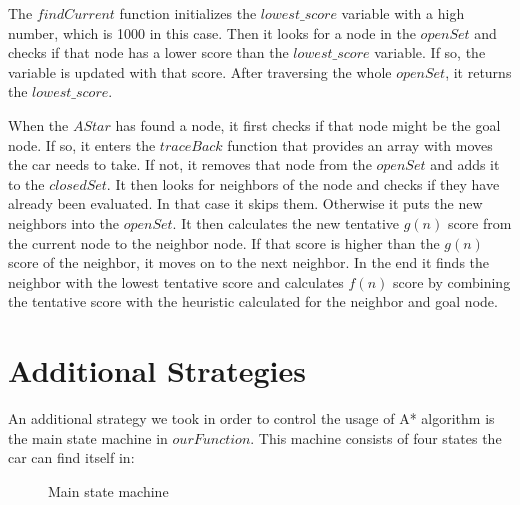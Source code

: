 \documentclass[a4paper]{article}
\begin{document}
The $findCurrent$ function initializes the $lowest\_score$ variable with a high number, which is 1000 in this case. Then it looks for a node in the $openSet$ and checks if that node has a lower score than the $lowest\_score$ variable. If so, the variable is updated with that score. After traversing the whole $openSet$, it returns the $lowest\_score$.

When the $AStar$ has found a node, it first checks if that node might be the goal node. If so, it enters the $traceBack$ function that provides an array with moves the car needs to take. If not, it removes that node from the $openSet$ and adds it to the $closedSet$. It then looks for neighbors of the node and checks if they have already been evaluated. In that case it skips them. Otherwise it puts the new neighbors into the $openSet$. It then calculates the new tentative $g(n)$ score from the current node to the neighbor node. If that score is higher than the $g(n)$ score of the neighbor, it moves on to the next neighbor. In the end it finds the neighbor with the lowest tentative score and calculates $f(n)$ score by combining the tentative score with the heuristic calculated for the neighbor and goal node.

\section{Additional Strategies}
An additional strategy we took in order to control the usage of A* algorithm is the main state machine in $ourFunction$. This machine consists of four states the car can find itself in:
\begin{figure}[H]
\begin{center}
\caption{Main state machine}
\end{center}
\end{figure}
\end{document}
